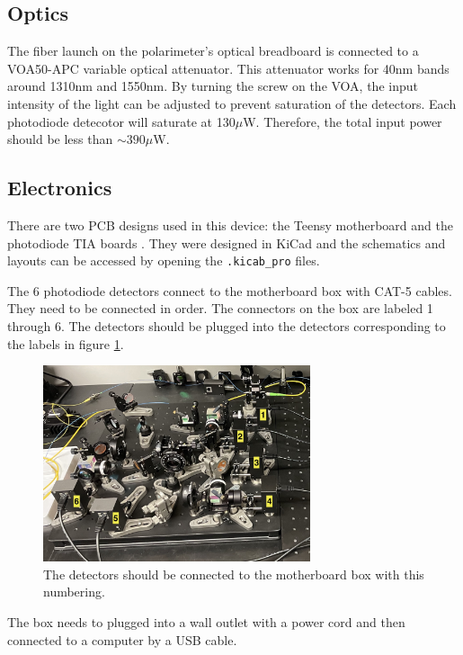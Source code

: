 \documentclass{article}
\begin{document}
\subsection{Optics}
The fiber launch on the polarimeter's optical breadboard is connected to a VOA50-APC variable optical attenuator. This attenuator works for 40nm bands around 1310nm and 1550nm. By turning the screw on the VOA, the input intensity of the light can be adjusted to prevent saturation of the detectors. Each photodiode detecotor will saturate at 130$\mu$W. Therefore, the total input power should be less than $\sim 390\mu$W. 

\subsection{Electronics}
There are two PCB designs used in this device: the Teensy motherboard and the photodiode TIA boards . They were designed in KiCad and the schematics and layouts can be accessed by opening the \verb|.kicab_pro| files.

The 6 photodiode detectors connect to the motherboard box with CAT-5 cables. They need to be connected in order. The connectors on the box are labeled 1 through 6. The detectors should be plugged into the detectors corresponding to the labels in figure \ref{detector_numbers}. 

\begin{figure}[h]
    \centering
    \includegraphics[width = 0.7\textwidth]{refs_figures/DetectorNumbers.jpg}
    \caption{The detectors should be connected to the motherboard box with this numbering.}
    \label{detector_numbers}
\end{figure}

The box needs to plugged into a wall outlet with a power cord and then connected to a computer by a USB cable.
\end{document}
